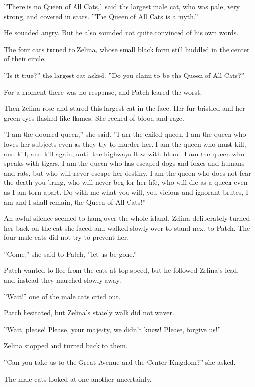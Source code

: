 \documentclass[11pt]{article}
\begin{document}
''There is no Queen of All Cats,'' said the largest male cat, who was pale, very strong, and covered in scars. ''The Queen of All Cats is a myth.''\par
He sounded angry. But he also sounded not quite convinced of his own words.\par
The four cats turned to Zelina, whose small black form still huddled in the center of their circle.\par
 ''Is it true?'' the largest cat asked. ''Do you claim to be the Queen of All Cats?''\par
 For a moment there was no response, and Patch feared the worst.\par
Then Zelina rose and stared this largest cat in the face. Her fur bristled and her green eyes flashed like flames. She reeked of blood and rage.\par
 ''I am the doomed queen,'' she said. ''I am the exiled queen. I am the queen who loves her subjects even as they try to murder her. I am the queen who must kill, and kill, and kill again, until the highways flow with blood. I am the queen who speaks with tigers. I am the queen who has escaped dogs and foxes and humans and rats, but who will never escape her destiny. I am the queen who does not fear the death you bring, who will never beg for her life, who will die as a queen even as I am torn apart. Do with me what you will, you vicious and ignorant brutes, I am and I shall remain, the Queen of All Cats!''\par
 An awful silence seemed to hang over the whole island. Zelina deliberately turned her back on the cat she faced and walked slowly over to stand next to Patch. The four male cats did not try to prevent her.\par
 ''Come,'' she said to Patch, ''let us be gone.''\par
 Patch wanted to flee from the cats at top speed, but he followed Zelina's lead, and instead they marched slowly away.\par
 ''Wait!'' one of the male cats cried out.\par
 Patch hesitated, but Zelina's stately walk did not waver.\par
 ''Wait, please! Please, your majesty, we didn't know! Please, forgive us!''\par
 Zelina stopped and turned back to them.\par
 ''Can you take us to the Great Avenue and the Center Kingdom?'' she asked.\par
 The male cats looked at one another uncertainly.\par
\end{document}
